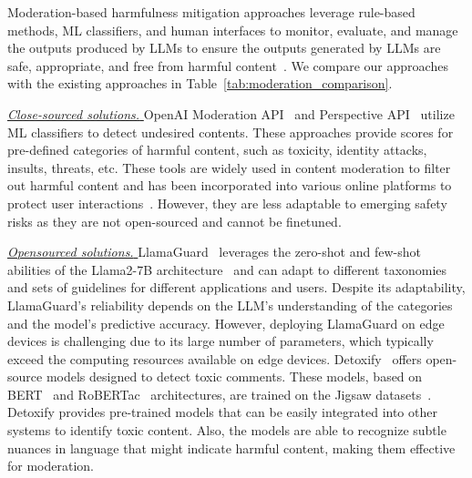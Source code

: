 

Moderation-based harmfulness mitigation approaches leverage rule-based methods, ML classifiers, and human interfaces to monitor, evaluate, and manage the outputs produced by LLMs to ensure the outputs generated by LLMs are safe, appropriate, and free from harmful content~\citep{openai-data-paper,nemo,perspective-api,Detoxify,guardrails}.
We compare our approaches with the existing approaches in Table~\ref{tab:moderation_comparison}.



\underline{\textit{Close-sourced solutions. }} 
OpenAI Moderation API~\citep{openai-data-paper} and Perspective API~\citep{perspective-api} utilize ML classifiers to detect undesired contents. These approaches provide scores for pre-defined categories of harmful content, such as toxicity, identity attacks, insults, threats, etc. These tools are widely used in content moderation to filter out harmful content and has been incorporated into various online platforms to protect user interactions~\citep{perspective-api-case-studies}. However, they are less adaptable to emerging safety risks as they are not open-sourced and cannot be finetuned. 


\underline{\textit{Opensourced solutions. }} 
LlamaGuard~\citep{inan2023llamaguard} leverages the zero-shot and few-shot abilities of the Llama2-7B architecture~\citep{touvron2023llama} and can adapt to different taxonomies and sets of guidelines for different applications and users. Despite its adaptability, LlamaGuard's reliability depends on the LLM's understanding of the categories and the model's predictive accuracy. However, deploying LlamaGuard on edge devices is challenging due to its large number of parameters, which typically exceed the computing resources available on edge devices.
Detoxify~\citep{Detoxify} offers open-source models designed to detect toxic comments. These models, based on BERT~\citep{devlin2018bert} and RoBERTac~\citep{liu2019roberta} architectures, are trained on the Jigsaw datasets~\citep{jigsaw-unintended-bias-in-toxicity-classification,jigsaw-toxic-comment-classification,jigsaw-multilingual}. Detoxify provides pre-trained models that can be easily integrated into other systems to identify toxic content. Also, the models are able to recognize subtle nuances in language that might indicate harmful content, making them effective for moderation.



